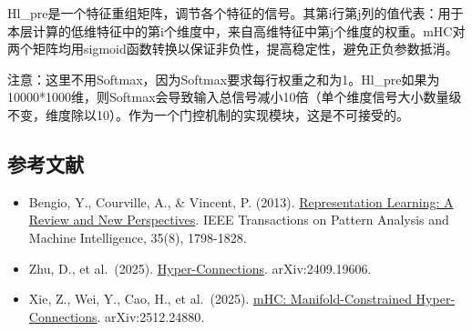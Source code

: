 Hl\_pre是一个特征重组矩阵，调节各个特征的信号。其第i行第j列的值代表：用于本层计算的低维特征中的第i个维度中，来自高维特征中第j个维度的权重。mHC对两个矩阵均用sigmoid函数转换以保证非负性，提高稳定性，避免正负参数抵消。

注意：这里不用Softmax，因为Softmax要求每行权重之和为1。Hl\_pre如果为10000*1000维，则Softmax会导致输入总信号减小10倍（单个维度信号大小数量级不变，维度除以10）。作为一个门控机制的实现模块，这是不可接受的。

\FloatBarrier
{}
\hypertarget{ux53c2ux8003ux6587ux732e-103}{%
\subsection{参考文献}\label{ux53c2ux8003ux6587ux732e-103}}

\vspace{0.25em}
\begin{itemize}
\tightlist
\item
  Bengio, Y., Courville, A., \& Vincent, P. (2013). \href{https://arxiv.org/abs/1206.5538}{Representation Learning: A Review and New Perspectives}. IEEE Transactions on Pattern Analysis and Machine Intelligence, 35(8), 1798-1828.
\item
  Zhu, D., et al.~(2025). \href{https://arxiv.org/abs/2409.19606}{Hyper-Connections}. arXiv:2409.19606.
\item
  Xie, Z., Wei, Y., Cao, H., et al.~(2025). \href{https://arxiv.org/abs/2512.24880}{mHC: Manifold-Constrained Hyper-Connections}. arXiv:2512.24880.
\end{itemize}

\clearpage
